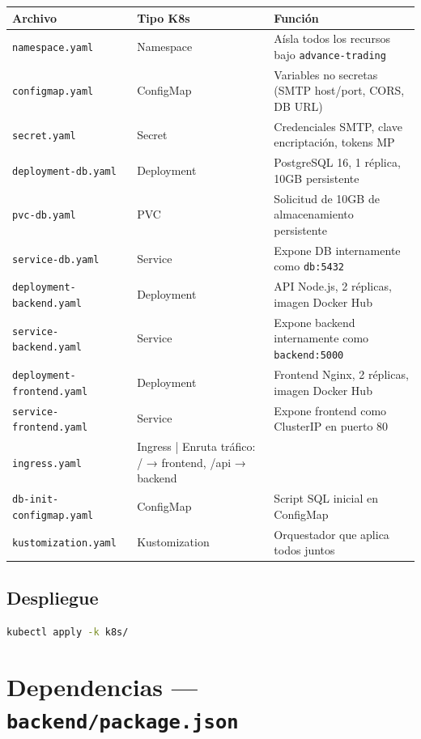 \documentclass[12pt,oneside]{article}
\begin{document}
\begin{longtable}{|p{4cm}|p{2.5cm}|p{8cm}|}
\hline
\textbf{Archivo} & \textbf{Tipo K8s} & \textbf{Función} \\
\hline
\texttt{namespace.yaml} & Namespace & Aísla todos los recursos bajo \texttt{advance-trading} \\
\hline
\texttt{configmap.yaml} & ConfigMap & Variables no secretas (SMTP host/port, CORS, DB URL) \\
\hline
\texttt{secret.yaml} & Secret & Credenciales SMTP, clave encriptación, tokens MP \\
\hline
\texttt{deployment-db.yaml} & Deployment & PostgreSQL 16, 1 réplica, 10GB persistente \\
\hline
\texttt{pvc-db.yaml} & PVC & Solicitud de 10GB de almacenamiento persistente \\
\hline
\texttt{service-db.yaml} & Service & Expone DB internamente como \texttt{db:5432} \\
\hline
\texttt{deployment-backend.yaml} & Deployment & API Node.js, 2 réplicas, imagen Docker Hub \\
\hline
\texttt{service-backend.yaml} & Service & Expone backend internamente como \texttt{backend:5000} \\
\hline
\texttt{deployment-frontend.yaml} & Deployment & Frontend Nginx, 2 réplicas, imagen Docker Hub \\
\hline
\texttt{service-frontend.yaml} & Service & Expone frontend como ClusterIP en puerto 80 \\
\hline
\texttt{ingress.yaml} & Ingress | Enruta tráfico: / → frontend, /api → backend \\
\hline
\texttt{db-init-configmap.yaml} & ConfigMap & Script SQL inicial en ConfigMap \\
\hline
\texttt{kustomization.yaml} & Kustomization & Orquestador que aplica todos juntos \\
\hline
\end{longtable}

\subsection{Despliegue}

\begin{lstlisting}[language=bash]
kubectl apply -k k8s/
\end{lstlisting}

\section{Dependencias — \texttt{backend/package.json}}
\end{document}
